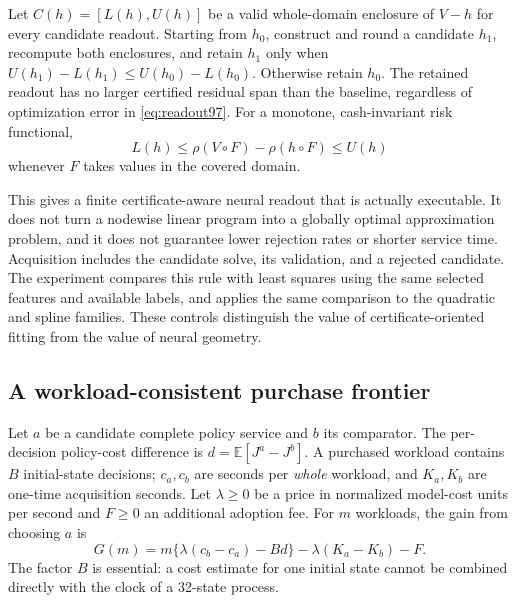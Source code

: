 \begin{proposition}\label{prop:readout97}
Let $C(h)=[L(h),U(h)]$ be a valid whole-domain enclosure of $V-h$ for every candidate readout. Starting from $h_0$, construct and round a candidate $h_1$, recompute both enclosures, and retain $h_1$ only when $U(h_1)-L(h_1)\leq U(h_0)-L(h_0)$. Otherwise retain $h_0$. The retained readout has no larger certified residual span than the baseline, regardless of optimization error in \eqref{eq:readout97}. For a monotone, cash-invariant risk functional,
\begin{equation}\label{eq:readout-risk97}
 L(h)\leq \rho(V\circ F)-\rho(h\circ F)\leq U(h)
\end{equation}
whenever $F$ takes values in the covered domain.
\end{proposition}

This gives a finite certificate-aware neural readout that is actually executable. It does not turn a nodewise linear program into a globally optimal approximation problem, and it does not guarantee lower rejection rates or shorter service time. Acquisition includes the candidate solve, its validation, and a rejected candidate. The experiment compares this rule with least squares using the same selected features and available labels, and applies the same comparison to the quadratic and spline families. These controls distinguish the value of certificate-oriented fitting from the value of neural geometry.

\subsection{A workload-consistent purchase frontier}
Let $a$ be a candidate complete policy service and $b$ its comparator. The per-decision policy-cost difference is $d=\mathbb E[J^a-J^b]$. A purchased workload contains $B$ initial-state decisions; $c_a,c_b$ are seconds per \emph{whole} workload, and $K_a,K_b$ are one-time acquisition seconds. Let $\lambda\geq0$ be a price in normalized model-cost units per second and $F\geq0$ an additional adoption fee. For $m$ workloads, the gain from choosing $a$ is
\begin{equation}\label{eq:purchase97}
 G(m)=m\{\lambda(c_b-c_a)-B d\}-\lambda(K_a-K_b)-F.
\end{equation}
The factor $B$ is essential: a cost estimate for one initial state cannot be combined directly with the clock of a 32-state process.

